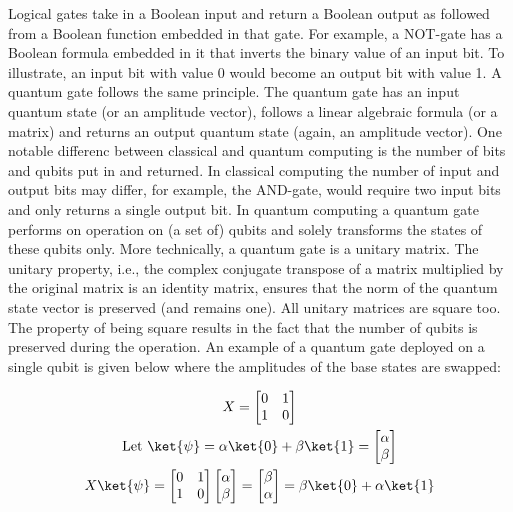 \documentclass[../main.tex]{subfiles}
\begin{document}
Logical gates take in a Boolean input and return a Boolean output as followed from a Boolean function embedded in that gate. For example, a NOT-gate has a Boolean formula embedded in it that inverts the binary value of an input bit. To illustrate, an input bit with value 0 would become an output bit with value 1. A quantum gate follows the same principle. The quantum gate has an input quantum state (or an amplitude vector), follows a linear algebraic formula (or a matrix) and returns an output quantum state (again, an amplitude vector). One notable differenc between classical and quantum computing is the number of bits and qubits put in and returned. In classical computing the number of input and output bits may differ, for example, the AND-gate, would require two input bits and only returns a single output bit. In quantum computing a quantum gate performs on operation on (a set of) qubits and solely transforms the states of these qubits only. More technically, a quantum gate is a unitary matrix.  The unitary property, i.e., the complex conjugate transpose of a matrix multiplied by the original matrix is an identity matrix, ensures that the norm of the quantum state vector is preserved (and remains one). All unitary matrices are square too. The property of being square results in the fact that the number of qubits is preserved during the operation. An example of a quantum gate deployed on a single qubit is given below where the amplitudes of the base states are swapped:

\begin{gather*}
    X = \begin{bmatrix} 
    0 & 1 \\
    1 & 0 \\
    \end{bmatrix} \\
    \text{Let } \ket{\psi} = \alpha \ket{0} + \beta \ket{1} = \begin{bmatrix}\alpha \\ \beta \end{bmatrix} \\
    X\ket{\psi} =  \begin{bmatrix} 
        0 & 1 \\
        1 & 0 \\
        \end{bmatrix} \begin{bmatrix}\alpha \\ \beta \end{bmatrix}  = \begin{bmatrix}\beta \\ \alpha \end{bmatrix} = \beta \ket{0} + \alpha \ket{1}
\label{eq: gate_x}
\end{gather*}
\end{document}
